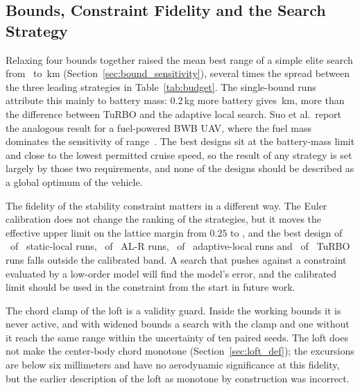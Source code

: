 \subsection{Bounds, Constraint Fidelity and the Search Strategy}
\label{sec:decoupling_contributions}
Relaxing four bounds together raised the mean best range of a simple elite search from \NpaperBndMean\ to \NwideBndMean\,km (Section~\ref{sec:bound_sensitivity}), several times the spread between the three leading strategies in Table~\ref{tab:budget}. The single-bound runs attribute this mainly to battery mass: $0.2$\,kg more battery gives \NbpBmassGain\,km, more than the difference between TuRBO and the adaptive local search. Suo et al.\ report the analogous result for a fuel-powered BWB UAV, where the fuel mass dominates the sensitivity of range~\cite{suo2026kriging}. The best designs sit at the battery-mass limit and close to the lowest permitted cruise speed, so the result of any strategy is set largely by those two requirements, and none of the designs should be described as a global optimum of the vehicle.

The fidelity of the stability constraint matters in a different way. The Euler calibration does not change the ranking of the strategies, but it moves the effective upper limit on the lattice margin from $0.25$ to \NcalCapEquiv, and the best design of \NcalOutLocTen\ of \NcalOutNLocTen\ static-local runs, \NcalOutAlR\ of \NcalOutNAlR\ AL-R runs, \NcalOutAdapt\ of \NcalOutNAdapt\ adaptive-local runs and \NcalOutTurbo\ of \NcalOutNTurbo\ TuRBO runs falls outside the calibrated band. A search that pushes against a constraint evaluated by a low-order model will find the model's error, and the calibrated limit should be used in the constraint from the start in future work.

The chord clamp of the loft is a validity guard. Inside the working bounds it is never active, and with widened bounds a search with the clamp and one without it reach the same range within the uncertainty of ten paired seeds. The loft does not make the center-body chord monotone (Section~\ref{sec:loft_def}); the excursions are below six millimeters and have no aerodynamic significance at this fidelity, but the earlier description of the loft as monotone by construction was incorrect.

